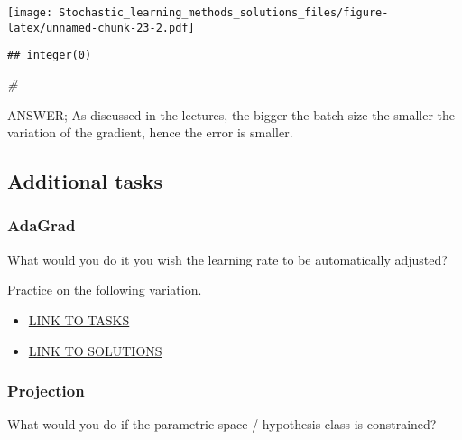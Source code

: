 \documentclass[
]{article}
\newenvironment{Shaded}{\begin{snugshade}}{\end{snugshade}}
\newcommand{\CommentTok}[1]{\textcolor[rgb]{0.56,0.35,0.01}{\textit{#1}}}
\begin{document}
\texttt{[image: Stochastic\_learning\_methods\_solutions\_files/figure-latex/unnamed-chunk-23-2.pdf]}

\begin{verbatim}
## integer(0)
\end{verbatim}

\begin{Shaded}
\begin{Highlighting}[]
\CommentTok{\# }
\end{Highlighting}
\end{Shaded}

ANSWER; As discussed in the lectures, the bigger the batch size the
smaller the variation of the gradient, hence the error is smaller.

\hypertarget{additional-tasks}{%
\subsection{Additional tasks}\label{additional-tasks}}

\hypertarget{adagrad}{%
\subsubsection{AdaGrad}\label{adagrad}}

What would you do it you wish the learning rate to be automatically
adjusted?

Practice on the following variation.

\begin{itemize}
\item
  \href{http://htmlpreview.github.io/?https://github.com/georgios-stats/Machine_Learning_and_Neural_Networks_III_Epiphany_2023/tree/main/Computer_practical/Stochastic_learning_methods_AdaGrad_tasks.nb.html}{LINK
  TO TASKS}
\item
  \href{http://htmlpreview.github.io/?https://github.com/georgios-stats/Machine_Learning_and_Neural_Networks_III_Epiphany_2023/tree/main/Computer_practical/Stochastic_learning_methods_AdaGrad_solutions.nb.html}{LINK
  TO SOLUTIONS}
\end{itemize}

\hypertarget{projection}{%
\subsubsection{Projection}\label{projection}}

What would you do if the parametric space / hypothesis class is
constrained?
\end{document}
